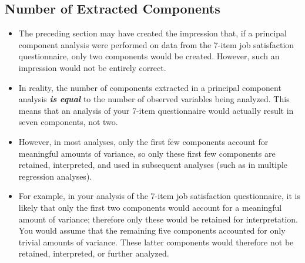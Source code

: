 \documentclass[a4paper,12pt]{article}
\begin{document}
\subsection{Number of Extracted Components}
\begin{itemize}
	\item The preceding section may have created the impression
	that, if a principal component analysis were performed on data from the 7-item job satisfaction
	questionnaire, only two components would be created.  However, such an impression would not
	be entirely correct.
	
\item In reality, the number of components extracted in a principal component analysis \textbf{\emph{is equal}} to the
	number of observed variables being analyzed.  This means that an analysis of your 7-item
	questionnaire would actually result in seven components, not two.
	
\item 	However, in most analyses, only the first few components account for meaningful amounts of
	variance, so only these first few components are retained, interpreted, and used in subsequent
	analyses (such as in multiple regression analyses).  
	
\item For example, in your analysis of the 7-item
	job satisfaction questionnaire, it is likely that only the first two components would account for a
	meaningful amount of variance; therefore only these would be retained for interpretation.  You
	would assume that the remaining five components accounted for only trivial amounts of
	variance.  These latter components would therefore not be retained, interpreted, or further
	analyzed.
\end{itemize}
\end{document}
